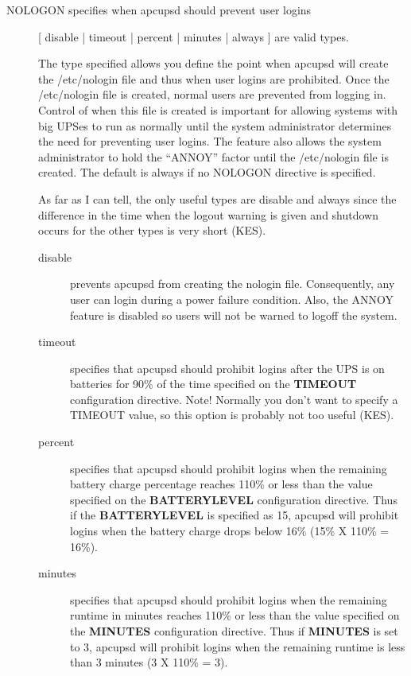 {{{{{{{{{{{\begin{description}
\item [NOLOGON \lt{}specifies when apcupsd should prevent user
   logins\gt{}]
[ disable | timeout | percent | minutes | always ] are valid types.  

The type specified allows you define the point when apcupsd will create the
/etc/nologin file and thus when user logins are prohibited. Once the
/etc/nologin file is created, normal users are prevented from logging in.
Control of when this file is created is important for allowing systems with
big UPSes to run as normally until the system administrator determines the
need for preventing user logins. The feature also allows the system
administrator to hold the ``ANNOY'' factor until the /etc/nologin file is
created. The default is always if no NOLOGON directive is specified.  

As far as I can tell, the only useful types are disable and always since the
difference in the time when the logout warning is given and shutdown occurs
for the other types is very short (KES).  

\begin{description}

\item [disable]
   prevents apcupsd from creating the nologin file.  Consequently, any user can
login during a power failure condition.  Also, the ANNOY feature is disabled
so users will not be warned to logoff the system.  

\item [timeout]
   specifies that apcupsd should prohibit logins after the UPS is on batteries
for 90\% of the time specified on the {\bf TIMEOUT} configuration directive.
Note! Normally you don't want to specify a TIMEOUT value, so this option is
probably not too useful (KES).  

\item [percent]
   specifies that apcupsd should prohibit logins when the remaining battery
charge percentage reaches 110\% or less than the value specified on the {\bf
BATTERYLEVEL} configuration directive. Thus if the {\bf BATTERYLEVEL} is
specified as 15, apcupsd will prohibit logins when the battery charge drops
below 16\% (15\% X 110\% = 16\%).  

\item [minutes]
   specifies that apcupsd should prohibit logins when the remaining runtime in
minutes reaches 110\% or less than the value specified on the {\bf MINUTES}
configuration directive.  Thus if {\bf MINUTES} is set to 3, apcupsd will
prohibit logins when the remaining runtime is less than 3 minutes (3 X 110\% =
3).  


\end{description}
\end{description}}}}}}}}}}}}
